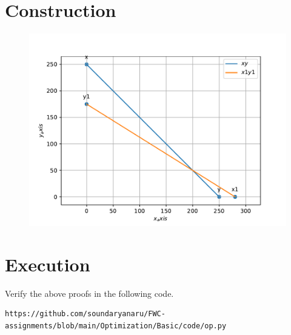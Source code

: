 \documentclass[10pt, a4paper]{article}
\begin{document}
\section{Construction}
\begin{figure}[h]
\includegraphics[scale=0.5]{opti_1.pdf} 
\end{figure}
\section{Execution}
Verify the above proofs in the following code.\\
\begin{lstlisting}
https://github.com/soundaryanaru/FWC-assignments/blob/main/Optimization/Basic/code/op.py
\end{lstlisting}
 
\end{document}
